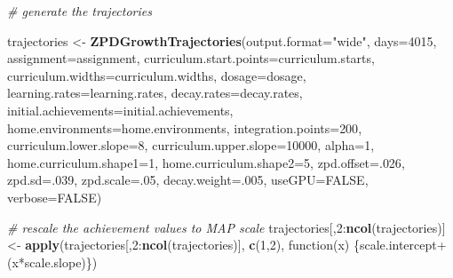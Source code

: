 \documentclass[english,floatsintext,jou]{apa6}
\newenvironment{Shaded}{\begin{snugshade}}{\end{snugshade}}
\newcommand{\KeywordTok}[1]{\textcolor[rgb]{0.13,0.29,0.53}{\textbf{{#1}}}}
\newcommand{\DataTypeTok}[1]{\textcolor[rgb]{0.13,0.29,0.53}{{#1}}}
\newcommand{\DecValTok}[1]{\textcolor[rgb]{0.00,0.00,0.81}{{#1}}}
\newcommand{\StringTok}[1]{\textcolor[rgb]{0.31,0.60,0.02}{{#1}}}
\newcommand{\CommentTok}[1]{\textcolor[rgb]{0.56,0.35,0.01}{\textit{{#1}}}}
\newcommand{\OtherTok}[1]{\textcolor[rgb]{0.56,0.35,0.01}{{#1}}}
\newcommand{\NormalTok}[1]{{#1}}
\theoremstyle{definition}
\theoremstyle{definition}
\theoremstyle{definition}
\theoremstyle{remark}
\begin{document}
\begin{appendix}
\begin{Shaded}
\begin{Highlighting}[]
\CommentTok{# generate the trajectories}

\NormalTok{trajectories <-}\StringTok{ }\KeywordTok{ZPDGrowthTrajectories}\NormalTok{(}\DataTypeTok{output.format=}\StringTok{"wide"}\NormalTok{,}
\DataTypeTok{days=}\DecValTok{4015}\NormalTok{,}
\DataTypeTok{assignment=}\NormalTok{assignment, }
\DataTypeTok{curriculum.start.points=}\NormalTok{curriculum.starts, }
\DataTypeTok{curriculum.widths=}\NormalTok{curriculum.widths,}
\DataTypeTok{dosage=}\NormalTok{dosage,}
\DataTypeTok{learning.rates=}\NormalTok{learning.rates,}
\DataTypeTok{decay.rates=}\NormalTok{decay.rates,}
\DataTypeTok{initial.achievements=}\NormalTok{initial.achievements,}
\DataTypeTok{home.environments=}\NormalTok{home.environments,}
\DataTypeTok{integration.points=}\DecValTok{200}\NormalTok{,}
\DataTypeTok{curriculum.lower.slope=}\DecValTok{8}\NormalTok{,}
\DataTypeTok{curriculum.upper.slope=}\DecValTok{10000}\NormalTok{,}
\DataTypeTok{alpha=}\DecValTok{1}\NormalTok{,}
\DataTypeTok{home.curriculum.shape1=}\DecValTok{1}\NormalTok{,}
\DataTypeTok{home.curriculum.shape2=}\DecValTok{5}\NormalTok{,}
\DataTypeTok{zpd.offset=}\NormalTok{.}\DecValTok{026}\NormalTok{,}
\DataTypeTok{zpd.sd=}\NormalTok{.}\DecValTok{039}\NormalTok{,}
\DataTypeTok{zpd.scale=}\NormalTok{.}\DecValTok{05}\NormalTok{,}
\DataTypeTok{decay.weight=}\NormalTok{.}\DecValTok{005}\NormalTok{,}
\DataTypeTok{useGPU=}\OtherTok{FALSE}\NormalTok{,}
\DataTypeTok{verbose=}\OtherTok{FALSE}\NormalTok{)}

\CommentTok{# rescale the achievement values to MAP scale}
\NormalTok{trajectories[,}\DecValTok{2}\NormalTok{:}\KeywordTok{ncol}\NormalTok{(trajectories)] <-}\StringTok{ }\KeywordTok{apply}\NormalTok{(trajectories[,}\DecValTok{2}\NormalTok{:}\KeywordTok{ncol}\NormalTok{(trajectories)], }
\KeywordTok{c}\NormalTok{(}\DecValTok{1}\NormalTok{,}\DecValTok{2}\NormalTok{), function(x) \{scale.intercept+(x*scale.slope)\})}


\end{Highlighting}
\end{Shaded}
\end{appendix}
\end{document}
